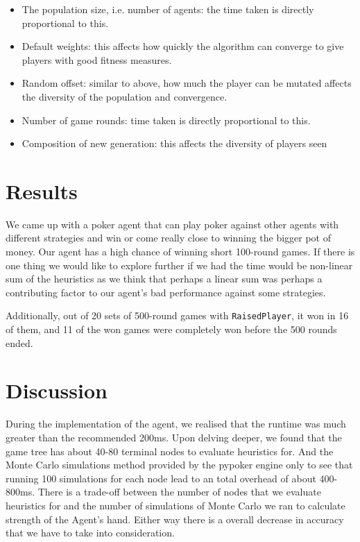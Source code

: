 \documentclass{article}
\begin{document}
\begin{itemize}
    \item The population size, i.e. number of agents: the time taken is directly proportional to this.
    \item Default weights: this affects how quickly the algorithm can converge to give players with good fitness measures.
    \item Random offset: similar to above, how much the player can be mutated affects the diversity of the population and convergence.	
    \item Number of game rounds: time taken is directly proportional to this.
    \item Composition of new generation: this affects the diversity of players seen 
\end{itemize}


\section{Results}
We came up with a poker agent that can play poker against other agents with different strategies and win or come really close to winning the bigger pot of money. Our agent has a high chance of winning short 100-round games. If there is one thing we would like to explore further if we had the time would be non-linear sum of the heuristics as we think that perhaps a linear sum was perhaps a contributing factor to our agent's bad performance against some strategies.

Additionally, out of 20 sets of 500-round games with {\tt RaisedPlayer}, it won in 16 of them, and 11 of the won games were completely won before the 500 rounds ended. 

\section{Discussion}
During the implementation of the agent, we realised that the runtime was much greater than the recommended 200ms. Upon delving deeper, we found that the game tree has about 40-80 terminal nodes to evaluate heuristics for. And the Monte Carlo simulations method provided by the pypoker engine only to see that running 100 simulations for each node lead to an total overhead of about 400-800ms. There is a trade-off between the number of nodes that we evaluate heuristics for and the number of simulations of Monte Carlo we ran to calculate strength of the Agent's hand. Either way there is a overall decrease in accuracy that we have to take into consideration.
\end{document}
